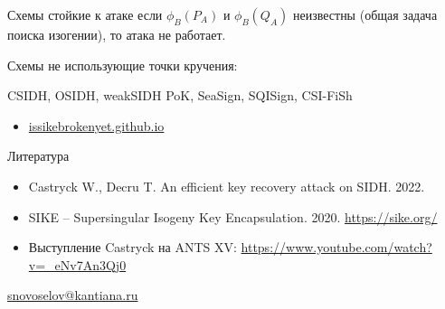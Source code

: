 \documentclass{beamer}
\begin{document}
\begin{frame}{Схемы стойкие к атаке}
	 если $\phi_B(P_A)$ и $\phi_B(Q_A)$ неизвестны (общая задача поиска изогении), то атака не работает.
	
	\vspace{1em}
	Схемы не использующие точки кручения:
	\vspace*{1em}
	
	CSIDH, OSIDH, weakSIDH PoK, SeaSign, SQISign, CSI-FiSh
	\vspace*{1em}
	\begin{itemize}
		\item[\structure{{\faGlobe}}] \href{https://issikebrokenyet.github.io/}{issikebrokenyet.github.io}
	\end{itemize}
\end{frame}

\begin{frame}{Литература}
	\begin{itemize}
		\item[\structure{{\faScroll}}] Castryck W., Decru T. An efficient key recovery attack
		on SIDH. 2022.
		\vspace{0.5em}
		
		\item[\structure{{\faGlobe}}] SIKE -- Supersingular Isogeny Key Encapsulation. 2020. \url{https://sike.org/}
		\vspace{0.5em}
		
		\item[\structure{{\faYoutube}}]
		Выступление Castryck на ANTS XV:
		\url{https://www.youtube.com/watch?v=_eNv7An3Qj0}
	\end{itemize}

    \begin{center}
        \begin{tcolorbox}[enhanced,hbox,colback=block-green-color-bg,colframe=subsection-color!120,title=Контакты,center title]
            \begin{varwidth}{\textwidth}
                \begin{center}
                    \href{mailto:snovoselov@kantiana.ru}{snovoselov@kantiana.ru}
                \end{center}
            \end{varwidth}
        \end{tcolorbox}
    \end{center}\end{frame}
\end{document}
